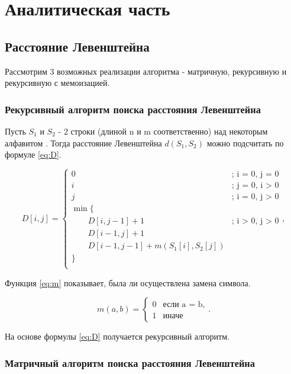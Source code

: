\chapter{Аналитическая часть}

\section{Расстояние Левенштейна}

Рассмотрим 3 возможных реализации алгоритма - матричную, рекурсивную и рекурсивную с мемоизацией.

\subsection{Рекурсивный алгоритм поиска расстояния Левенштейна}

Пусть $S_1$ и $S_2$ - 2 строки (длиной n и m соответственно) над некоторым алфавитом \cite{levenshtein2}. Тогда расстояние Левенштейна $d(S_1, S_2)$ можно подсчитать по формуле \ref{eq:D}. 

\begin{equation}
	\label{eq:D}
	D[i, j] = \begin{cases}
		0 &\text{; i = 0, j = 0}\\
		i &\text{; j = 0, i > 0}\\
		j &\text{; i = 0, j > 0}\\
		\min \lbrace \\
		\qquad D[i, j-1]+ 1 &\text{; i > 0, j > 0}\\
		\qquad D[i-1, j] + 1 \\
		\qquad D[i-1, j-1] + m(S_1[i], S_2[j]) \\
		\rbrace \\
	\end{cases},
\end{equation}

Функция \ref{eq:m} показывает, была ли осуществлена замена символа.

\begin{equation}
	\label{eq:m}
	m(a, b) = \begin{cases}
		0 &\text{если a = b,}\\
		1 &\text{иначе}
	\end{cases}.
\end{equation}

На основе формулы \ref{eq:D} получается рекурсивный алгоритм.

\subsection{Матричный алгоритм поиска расстояния Левенштейна}

